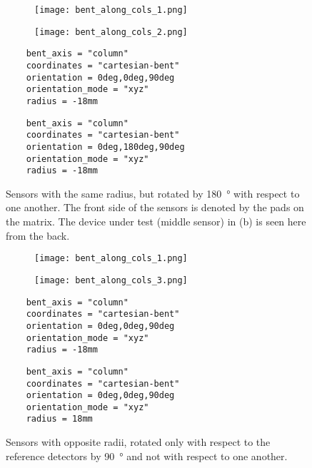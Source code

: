     \begin{figure}[!htp]
    \centering
    \begin{subfigure}{.45\textwidth}
      \centering
      \texttt{[image: bent\_along\_cols\_1.png]}
      \caption{}
      \label{fig:upstream}
    \end{subfigure}%
    \begin{subfigure}{.45\textwidth}
      \centering
      \texttt{[image: bent\_along\_cols\_2.png]}
      \caption{}
      \label{fig:downstream}
    \end{subfigure}
    \begin{multicols}{2}
    \begin{verbatim}
    bent_axis = "column"
    coordinates = "cartesian-bent"
    orientation = 0deg,0deg,90deg
    orientation_mode = "xyz"
    radius = -18mm
    \end{verbatim}
    \begin{verbatim}
    bent_axis = "column"
    coordinates = "cartesian-bent"
    orientation = 0deg,180deg,90deg
    orientation_mode = "xyz"
    radius = -18mm
    \end{verbatim}
    \end{multicols}
    \caption{Sensors with the same radius, but rotated by \SI{180}{\degree} with respect to one another. The front side of the sensors is denoted by the pads on the matrix. The device under test (middle sensor) in (b) is seen here from the back.}
    \label{fig:rotated_sensors_along_col_1}
    \end{figure}
    
    
    \begin{figure}[!htp]
    \centering
    \begin{subfigure}{.45\textwidth}
      \centering
      \texttt{[image: bent\_along\_cols\_1.png]}
      \caption{}
      \label{fig:upstream}
    \end{subfigure}%
    \begin{subfigure}{.45\textwidth}
      \centering
      \texttt{[image: bent\_along\_cols\_3.png]}
      \caption{}
      \label{fig:downstream}
    \end{subfigure}
    \begin{multicols}{2}
    \begin{verbatim}
    bent_axis = "column"
    coordinates = "cartesian-bent"
    orientation = 0deg,0deg,90deg
    orientation_mode = "xyz"
    radius = -18mm
    \end{verbatim}
    \begin{verbatim}
    bent_axis = "column"
    coordinates = "cartesian-bent"
    orientation = 0deg,0deg,90deg
    orientation_mode = "xyz"
    radius = 18mm
    \end{verbatim}
    \end{multicols}
    \caption{Sensors with opposite radii, rotated only with respect to the reference detectors by \SI{90}{\degree} and not with respect to one another.}
    \label{fig:rotated_sensors_along_col_2}
    \end{figure}